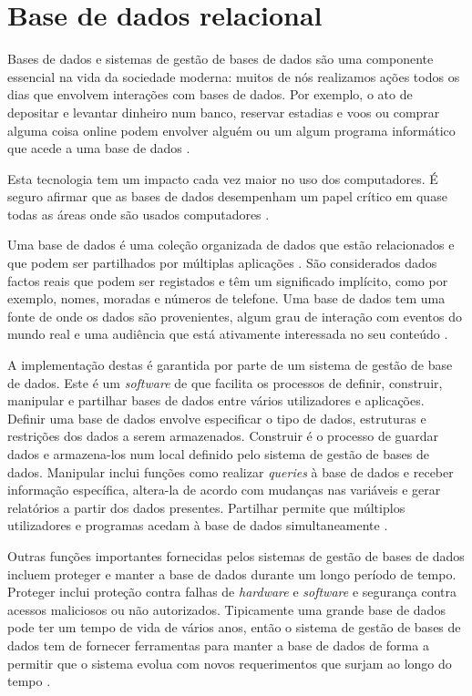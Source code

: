 \documentclass[11pt,twoside,a4paper]{report}
\begin{document}
\section{Base de dados relacional}
Bases de dados e sistemas de gestão de bases de dados são uma componente essencial na vida da sociedade moderna: muitos de nós realizamos ações todos os dias que envolvem interações com bases de dados. Por exemplo, o ato de depositar e levantar dinheiro num banco, reservar estadias e voos ou comprar alguma coisa online podem envolver alguém ou um algum programa informático que acede a uma base de dados \cite{Elmasri:2010:FDS:1855347}.\par
Esta tecnologia tem um impacto cada vez maior no uso dos computadores. É seguro afirmar que as bases de dados desempenham um papel crítico em quase todas as áreas onde são usados computadores \cite{Elmasri:2010:FDS:1855347}.\par
Uma base de dados é uma coleção organizada de dados que estão relacionados e que podem ser partilhados por múltiplas aplicações \cite{definicao_base_dados}. São considerados dados factos reais que podem ser registados e têm um significado implícito, como por exemplo, nomes, moradas e números de telefone. Uma base de dados tem uma fonte de onde os dados são provenientes, algum grau de interação com eventos do mundo real e uma audiência que está ativamente interessada no seu conteúdo \cite{Elmasri:2010:FDS:1855347}.\par
A implementação destas é garantida por parte de um sistema de gestão de base de dados. Este é um \textit{software} de que facilita os processos de definir, construir, manipular e partilhar bases de dados entre vários utilizadores e aplicações. Definir uma base de dados envolve especificar o tipo de dados, estruturas e restrições dos dados a serem armazenados. Construir é o processo de guardar dados e armazena-los num local definido pelo sistema de gestão de bases de dados. Manipular inclui funções como realizar \textit{queries} à base de dados e receber informação específica, altera-la de acordo com mudanças nas variáveis e gerar relatórios a partir dos dados presentes. Partilhar permite que múltiplos utilizadores e programas acedam à base de dados simultaneamente \cite{Elmasri:2010:FDS:1855347}.\par
Outras funções importantes fornecidas pelos sistemas de gestão de bases de dados incluem proteger e manter a base de dados durante um longo período de tempo. Proteger inclui proteção contra falhas de \textit{hardware} e \textit{software} e segurança contra acessos maliciosos ou não autorizados. Tipicamente uma grande base de dados pode ter um tempo de vida de vários anos, então o sistema de gestão de bases de dados tem de fornecer ferramentas para manter a base de dados de forma a permitir que o sistema evolua com novos requerimentos que surjam ao longo do tempo \cite{Elmasri:2010:FDS:1855347}.
\end{document}
